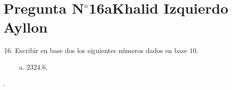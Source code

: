 \section{Pregunta N$^{\circ}$16a\qquad Khalid Izquierdo Ayllon}

\begin{frame}
	\begin{enumerate}\setcounter{enumi}{15}
		\item

		      Escribir en base dos los siguientes números dados en base $10$.


		      \begin{enumerate}[a)]
			      \item

			            $2324.6$.
		      \end{enumerate}
	\end{enumerate}

	\begin{solution}
		.
	\end{solution}
\end{frame}


